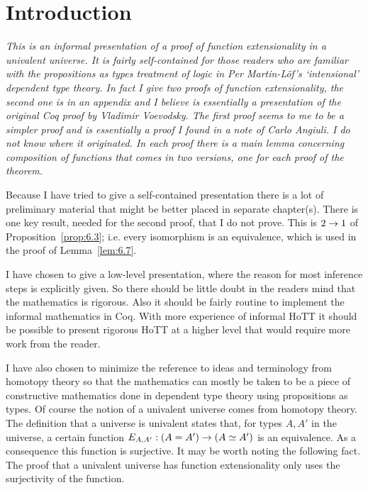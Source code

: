 
\section{Introduction}
{\it This is an informal presentation of a proof of function extensionality in a univalent universe.  It is fairly self-contained for those readers who are familiar with the propositions as types treatment of logic in Per Martin-L\"{o}f's `intensional' dependent type theory.  In fact I give two proofs of function extensionality, the second one is in an appendix and I believe is essentially a presentation of the original Coq proof by Vladimir Voevodsky.  The first proof seems to me to be a simpler proof and is essentially a proof I found in a note of Carlo Angiuli.  I do not know where it originated.  In each proof there is a main lemma concerning composition of functions that comes in two versions, one for each proof of the theorem.

Because I have tried to give a self-contained presentation there is a lot of preliminary material that might be better placed in separate chapter(s).  There is one key result, needed for the second proof, that I do not prove.
This is $2\rightarrow 1$ of Proposition~\ref{prop:6.3}; i.e. every isomorphism is an 
equivalence, which is used in the proof of Lemma~\ref{lem:6.7}.

I have chosen to give a low-level presentation, where the reason for most 
inference steps is explicitly given.  So there should be little doubt in the readers mind that the mathematics is rigorous.  Also it should be fairly routine to implement the informal mathematics in Coq.  With more experience of informal HoTT it should be possible to present rigorous HoTT at a higher level that would require more work from the reader.

I have also chosen to minimize the reference to ideas and terminology from homotopy theory so that the mathematics can mostly be taken to be a piece of constructive mathematics done in dependent type theory using propositions as types.  Of course the notion of a univalent universe comes from homotopy theory.  The definition that a universe is univalent states that, for types $A,A'$ in the universe, a certain function $E_{A,A'} :(A=A')\rightarrow (A\simeq A')$ is an equivalence.  As a consequence this function is surjective.  It may be worth noting the following fact. The proof that a univalent universe has function extensionality only uses the surjectivity of the function.
}

